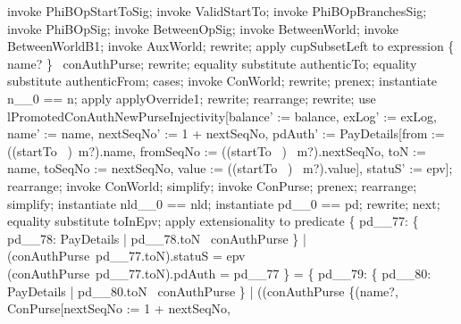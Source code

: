\begin{LPScript}\begin{zproof}[lPromotedAuxWorldStartToType]
    invoke PhiBOpStartToSig;
    invoke ValidStartTo;
    invoke PhiBOpBranchesSig;
    invoke PhiBOpSig;
    invoke BetweenOpSig;
    invoke BetweenWorld;
    invoke BetweenWorldB1;
    invoke AuxWorld;
    rewrite;
    apply cupSubsetLeft to expression \{ name? \} \cup \dom~conAuthPurse;
    rewrite;
    equality substitute authenticTo;
    equality substitute authenticFrom;
    cases;
        invoke ConWorld;
        rewrite;
        prenex;
        instantiate n\_\_0 == n;
        apply applyOverride1;
        rewrite;
        rearrange;
        rewrite;
        use lPromotedConAuthNewPurseInjectivity[balance' := balance,
            exLog' := exLog, name' := name, nextSeqNo' := 1 + nextSeqNo,
            pdAuth' := \theta PayDetails[from := ((startTo~ \inv)~m?).name,
                fromSeqNo := ((startTo~ \inv)~ m?).nextSeqNo, 
                toN := name, toSeqNo := nextSeqNo,
                value := ((startTo~ \inv)~ m?).value],
            statuS' := epv];
        rearrange;
        invoke ConWorld;
        simplify;
        invoke ConPurse;
        prenex;
        rearrange;
        simplify;
        instantiate nld\_\_0 == nld;
        instantiate pd\_\_0 == pd;
        rewrite;
    next;
        equality substitute toInEpv;
        apply extensionality to predicate
            \{ pd\_\_77: \{ pd\_\_78: PayDetails | pd\_\_78.toN \in \dom~conAuthPurse \}
              | (conAuthPurse~pd\_\_77.toN).statuS = epv
             \land (conAuthPurse~pd\_\_77.toN).pdAuth = pd\_\_77 \}
            = \{ pd\_\_79: \{ pd\_\_80: PayDetails | pd\_\_80.toN \in \dom~conAuthPurse \}
              | ((conAuthPurse \oplus \{(name?, \theta ConPurse[nextSeqNo := 1 + nextSeqNo,

\end{zproof}
\end{LPScript}
